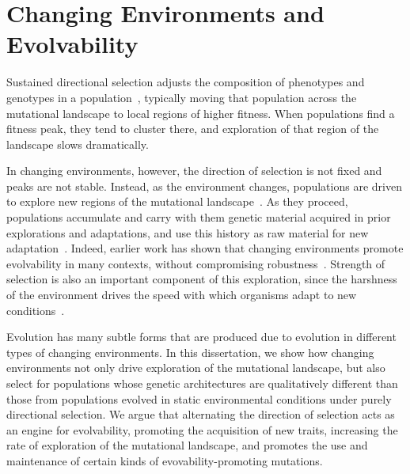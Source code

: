 \documentclass[PhD]{msu-thesis}
\begin{document}
\section{Changing Environments and Evolvability}
Sustained directional selection adjusts the composition of phenotypes and genotypes in a population~\cite{wright_evolution_1931}, typically moving that population across the mutational landscape to local regions of higher fitness. When populations find a fitness peak, they tend to cluster there, and exploration of that region of the landscape slows dramatically.

In changing environments, however, the direction of selection is not fixed and peaks are not stable. Instead, as the environment changes, populations are driven to explore new regions of the mutational landscape~\cite{kashtan_varying_2007,connelly_negative_2015}. As they proceed, populations accumulate and carry with them genetic material acquired in prior explorations and adaptations, and use this history as raw material for new adaptation~\cite{mcclintock_significance_1993}. Indeed, earlier work has shown that changing environments promote evolvability in many contexts, without compromising robustness~\cite{crombach_evolution_2008,wilke_evolution_2001}. Strength of selection is also an important component of this exploration, since the harshness of the environment drives the speed with which organisms adapt to new conditions~\cite{goddard_sex_2005}.

Evolution has many subtle forms that are produced due to evolution in different types of changing environments. In this dissertation, we show how changing environments not only drive exploration of the mutational landscape, but also select for populations whose genetic architectures are qualitatively different than those from populations evolved in static environmental conditions under purely directional selection. We argue that alternating the direction of selection acts as an engine for evolvability, promoting the acquisition of new traits, increasing the rate of exploration of the mutational landscape, and promotes the use and maintenance of certain kinds of evovability-promoting mutations.

\end{document}
